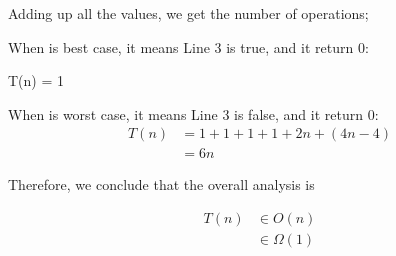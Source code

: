 \documentclass[11pt]{article}
\begin{document}
Adding up all the values, we get the number of operations;

When is best case, it means Line 3 is true, and it return 0:
\begin{center}
     T(n) = 1 
\end{center}
   
When is worst case, it means Line 3 is false, and it return 0:
\begin{align*}
T(n) &= 1 + 1 + 1 + 1 + 2n + (4n - 4)\\
     &= 6n
\end{align*}

Therefore, we conclude that the overall analysis is

\begin{align*}
T(n) &\in O(n)\\
     &\in \Omega(1)
\end{align*}
\end{document}

